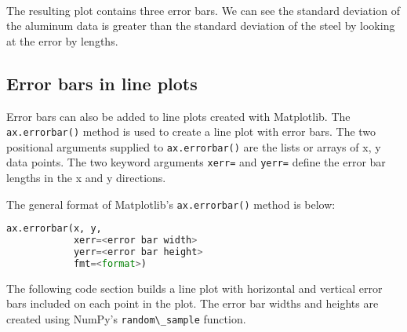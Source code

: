 \documentclass{book}
\newcommand{\passthrough}[1]{#1}
\begin{document}
    \begin{center}
    \end{center}
    { \hspace*{\fill} \\}
    

    
        The resulting plot contains three error bars. We can see the standard
deviation of the aluminum data is greater than the standard deviation of
the steel by looking at the error by lengths.
    




    
        \hypertarget{error-bars-in-line-plots}{%
\subsection{Error bars in line plots}\label{error-bars-in-line-plots}}
    




    
        Error bars can also be added to line plots created with Matplotlib. The
\passthrough{\lstinline!ax.errorbar()!} method is used to create a line
plot with error bars. The two positional arguments supplied to
\passthrough{\lstinline!ax.errorbar()!} are the lists or arrays of x, y
data points. The two keyword arguments \passthrough{\lstinline!xerr=!}
and \passthrough{\lstinline!yerr=!} define the error bar lengths in the
x and y directions.

The general format of Matplotlib's
\passthrough{\lstinline!ax.errorbar()!} method is below:

\begin{lstlisting}[language=Python]
ax.errorbar(x, y,
            xerr=<error bar width>
            yerr=<error bar height>
            fmt=<format>)
\end{lstlisting}

The following code section builds a line plot with horizontal and
vertical error bars included on each point in the plot. The error bar
widths and heights are created using NumPy's
\passthrough{\lstinline!random\_sample!} function.
    
\end{document}
